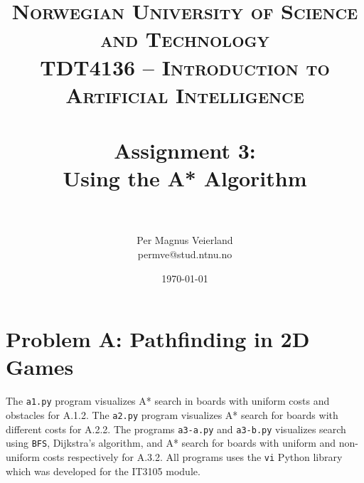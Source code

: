 

\usepackage{float}

\title{
\normalfont \normalsize
\textsc{Norwegian University of Science and Technology\\TDT4136 -- Introduction to Artificial Intelligence} \\ [25pt]
\horrule{0.5pt} \\[0.4cm]
\huge Assignment 3:\\ Using the A* Algorithm\\
\horrule{2pt} \\[0.5cm]
}

\author{Per Magnus Veierland\\permve@stud.ntnu.no}

\date{\normalsize\today}


\newcommand{\showboard}[4]{
    \begin{figure}[H]
    \centering
    \texttt{[image: images/\#1-\#2]}
    \caption{#3}
    \end{figure}
}

\newcommand{\showbfs}[2]{\showboard{#1}{breadth_first}{Breadth First Search}{#2}}
\newcommand{\showdijkstra}[2]{\showboard{#1}{dijkstra}{Dijkstra's Algorithm}{#2}}
\newcommand{\showastar}[2]{\showboard{#1}{astar}{A* Search}{#2}}
\newcommand{\showboards}[2]{\showbfs{#1}{#2}\showdijkstra{#1}{#2}\showastar{#1}{#2}}




\maketitle

\section*{Problem A: Pathfinding in 2D Games}

The \texttt{a1.py} program visualizes A* search in boards with uniform costs and obstacles for A.1.2. The \texttt{a2.py} program visualizes A* search for boards with different costs for A.2.2. The programs \texttt{a3-a.py} and \texttt{a3-b.py} visualizes search using \texttt{BFS}, Dijkstra's algorithm, and A* search for boards with uniform and non-uniform costs respectively for A.3.2. All programs uses the \texttt{vi} Python library which was developed for the IT3105 module.

